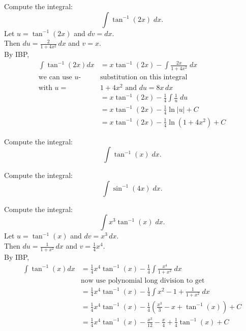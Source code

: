 \documentclass{ximera}
\begin{document}
\begin{example}
Compute the integral:
  \[
  \int \tan^{-1}(2x) \;dx.
  \]
Let $u = \tan^{-1}(2x)$   and   $dv = dx$.\\
  Then $du = \frac{2}{1+4x^2}\, dx$   and   $v = x$.\\
By IBP,
  \begin{align*}
  \int  \tan^{-1}(2x) dx &= x\tan^{-1}(2x) - \int \frac{2x}{1+4x^2} \;dx\\
  \text{we can use $u$-} & \text{substitution on this integral} \\
  \text{with $u =$} &  1+4x^2 \text{ and } du = 8x \, dx \\
  &= x\tan^{-1}(2x) - \frac14 \int \frac{1}{u} \; du\\
  &= x\tan^{-1}(2x) - \frac14 \ln|u| + C\\
  &= x\tan^{-1}(2x) - \frac14 \ln(1+4x^2) + C
  \end{align*}
  
\end{example}

\begin{problem}
Compute the integral:
  \[
  \int \tan^{-1}(x) \;dx.
  \]

\end{problem}

\begin{problem}
Compute the integral:
  \[
  \int \sin^{-1}(4x) \;dx.
  \]

\end{problem}

\begin{example}
Compute the integral:
  \[
  \int x^3\tan^{-1}(x) \;dx.
  \]
Let $u = \tan^{-1}(x)$   and   $dv = x^3 \, dx$.\\
  Then $du = \frac{1}{1+x^2}\, dx$   and   $v = \frac14 x^4$.\\
By IBP,
  \begin{align*}
  \int  \tan^{-1}(x) dx &= \frac14 x^4\tan^{-1}(x) - \frac14\int \frac{x^4}{1+x^2} \;dx\\
  & \text{now use polynomial long division to get} \\
  &= \frac14 x^4\tan^{-1}(x) - \frac14 \int x^2 - 1 + \frac{1}{1+x^2} \; dx\\
  &= \frac14 x^4\tan^{-1}(x) - \frac14\left(\frac{x^3}{3} - x + \tan^{-1}(x)\right) + C\\
  &= \frac14 x^4\tan^{-1}(x) - \frac{x^3}{12} - \frac{x}{4} + \frac14 \tan^{-1}(x) + C
  \end{align*}
  
\end{example}
\end{document}
